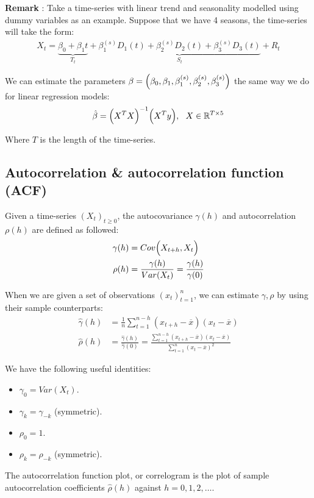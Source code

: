 \textbf{Remark} : Take a time-series with linear trend and seasonality modelled using dummy variables as an example. Suppose that we have 4 seasons, the time-series will take the form:
\begin{align*}
    X_t = \underbrace{\beta_0 + \beta_1t}_{T_t} + \underbrace{\beta_1^{(s)}D_1(t) + \beta_2^{(s)}D_2(t) + \beta_3^{(s)}D_3(t)}_{S_t} + R_t
\end{align*}

\noindent We can estimate the parameters $\beta=\Bigl( \beta_0, \beta_1, \beta^{(s)}_1, \beta^{(s)}_2, \beta^{(s)}_3 \Bigr)$ the same way we do for linear regression models:
\begin{align*}
    \hat\beta = \Bigl(X^TX\Bigr)^{-1} \Bigl(X^Ty\Bigr), \ \ X \in \mathbb{R}^{T\times 5}
\end{align*}

\noindent Where $T$ is the length of the time-series.


\subsection{Autocorrelation \& autocorrelation function (ACF)}
\begin{definition}
    Given a time-series $(X_t)_{t\ge0}$, the autocovariance $\gamma(h)$ and autocorrelation $\rho(h)$ are defined as followed:
    \begin{align*}
        \gamma(h) &= Cov\Bigl(X_{t+h}, X_{t}\Bigr) \\
        \rho(h) &= \frac{\gamma(h)}{Var(X_t)} = \frac{\gamma(h)}{\gamma(0)}
    \end{align*}

    \noindent When we are given a set of observations $(x_t)_{t=1}^n$, we can estimate $\gamma, \rho$ by using their sample counterparts:
    \begin{align*}
        \hat\gamma(h) &= \frac{1}{n}\sum_{t=1}^{n-h}(x_{t+h}-\overline{x})(x_t-\overline{x})
        \\
        \hat\rho(h) &= \frac{\hat\gamma(h)}{\hat\gamma(0)} = \frac{
            \sum_{t=1}^{n-h}(x_{t+h}-\overline{x})(x_t-\overline{x})
        }{
            \sum_{t=1}^n(x_{t}-\overline{x})^2
        }
    \end{align*}

    \noindent We have the following useful identities:
    \begin{itemize}
        \item $\gamma_0=Var(X_t)$.
        \item $\gamma_k=\gamma_{-k}$ (symmetric).
        \item $\rho_0 = 1$.
        \item $\rho_k = \rho_{-k}$ (symmetric).
    \end{itemize}
\end{definition}

\begin{definition}
    The autocorrelation function plot, or correlogram is the plot of sample autocorrelation coefficients $\hat\rho(h)$ against $h=0,1,2,\dots$.
\end{definition}


